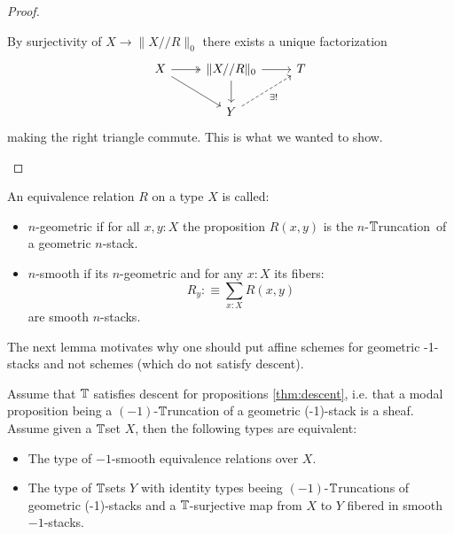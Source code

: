 \documentclass{article}
\newcommand{\truncation}{$\bT$runcation}
\newcommand{\red}[1]{{\color{red} #1}}
\begin{document}
\begin{proof}
\begin{itemize}
    By surjectivity of $X \to \|X // R \|_0$ there exists a unique factorization 
\[\begin{tikzcd}
	X & {\|X // R\|_0} & T \\
	& Y
	\arrow[two heads, from=1-1, to=1-2]
	\arrow[from=1-1, to=2-2]
	\arrow[from=1-2, to=1-3]
	\arrow[from=1-2, to=2-2]
	\arrow["{\exists!}"', dashed, from=2-2, to=1-3]
\end{tikzcd}\]
making the right triangle commute. This is what we wanted to show.
\end{itemize}
\end{proof}

\begin{definition}
An equivalence relation $R$ on a type $X$ is called:
\begin{itemize}
\item $n$-geometric if for all $x,y:X$ the proposition $R(x,y)$ is \red{the $n$-\truncation \ of} a geometric $n$-stack.
\item $n$-smooth if its $n$-geometric and for any $x:X$ its fibers:
\[R_y :\equiv \sum_{x:X} R(x,y)\]
are smooth $n$-stacks.
\end{itemize}
\end{definition}
\begin{rmk}
    The next lemma motivates why one should put affine schemes for geometric -1-stacks and not schemes (which do not satisfy descent).
\end{rmk}
\begin{lemma}\label{fundamental-propriety-algebraic-spaces}
Assume that $\mathbb{T}$ satisfies descent for propositions \ref{thm:descent}, i.e. that a modal proposition being a \red{$(-1)$-\truncation} of a geometric (-1)-stack is a sheaf. 
Assume given a $\mathbb{T}$set $X$, then the following types are equivalent:
\begin{itemize}
\item The type of $-1$-smooth equivalence relations over $X$.
\item The type of $\mathbb{T}$sets $Y$ with identity types beeing \red{$(-1)$-\truncation s of} geometric (-1)-stacks and a $\mathbb{T}$-surjective map from $X$ to $Y$ fibered in smooth $-1$-stacks.
\end{itemize}
\end{lemma}
\end{document}
